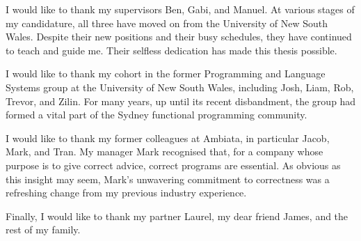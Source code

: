 
I would like to thank my supervisors Ben, Gabi, and Manuel.
At various stages of my candidature, all three have moved on from the University of New South Wales.
Despite their new positions and their busy schedules, they have continued to teach and guide me.
Their selfless dedication has made this thesis possible.

I would like to thank my cohort in the former Programming and Language Systems group at the University of New South Wales, including Josh, Liam, Rob, Trevor, and Zilin.
For many years, up until its recent disbandment, the group had formed a vital part of the Sydney functional programming community.


I would like to thank my former colleagues at Ambiata, in particular Jacob, Mark, and Tran.
My manager Mark recognised that, for a company whose purpose is to give correct advice, correct programs are essential.
As obvious as this insight may seem, Mark's unwavering commitment to correctness was a refreshing change from my previous industry experience.

Finally, I would like to thank my partner Laurel, my dear friend James, and the rest of my family.

